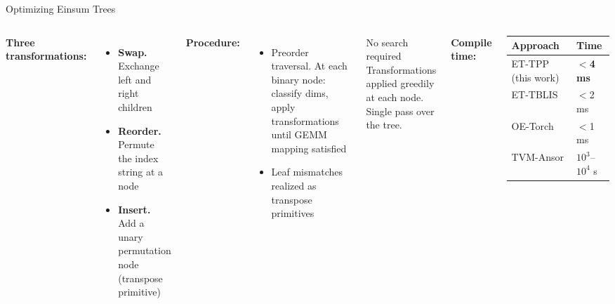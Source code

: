 \documentclass[aspectratio=169,10pt]{beamer}
\begin{document}
\begin{frame}{Optimizing Einsum Trees}

\begin{columns}[T]
\textbf{Three transformations:}
\begin{itemize}
  \item \textbf{Swap.} Exchange left and right children
  \item \textbf{Reorder.} Permute the index string at a node
  \item \textbf{Insert.} Add a unary permutation node (transpose primitive)
\end{itemize}

\medskip
\textbf{Procedure:}
\begin{itemize}
  \item Preorder traversal. At each binary node: classify dims, apply transformations until GEMM mapping satisfied
  \item Leaf mismatches realized as transpose primitives
\end{itemize}

\begin{block}{No search required}
Transformations applied greedily at each node.
Single pass over the tree.
\end{block}

\medskip
\textbf{Compile time:}

\smallskip
\begin{tabular}{@{}ll@{}}
\toprule
Approach & Time \\
\midrule
ET-TPP (this work) & \textbf{$<$4 ms} \\
ET-TBLIS            & $<$2 ms \\
OE-Torch            & $<$1 ms \\
TVM-Ansor           & \alert{$10^3$--$10^4$ s} \\
\bottomrule
\end{tabular}
\end{columns}
\end{frame}
\end{document}
